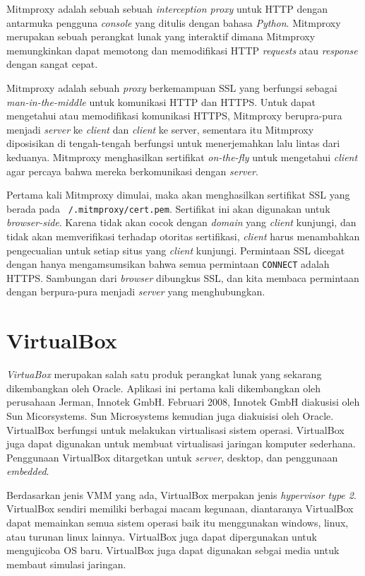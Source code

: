 Mitmproxy adalah sebuah sebuah \textit{interception proxy} untuk HTTP dengan antarmuka pengguna \textit{console} yang ditulis dengan bahasa \textit{Python}. Mitmproxy merupakan sebuah perangkat lunak yang interaktif dimana Mitmproxy memungkinkan dapat memotong dan memodifikasi HTTP \textit{requests} atau \textit{response} dengan sangat cepat.

Mitmproxy adalah sebuah \textit{proxy} berkemampuan SSL yang berfungsi sebagai \textit{man-in-the-middle} untuk komunikasi HTTP dan HTTPS. Untuk dapat mengetahui atau memodifikasi komunikasi HTTPS, Mitmproxy berupra-pura menjadi \textit{server} ke \textit{client} dan \textit{client} ke server, sementara itu Mitmproxy diposisikan di tengah-tengah berfungsi untuk menerjemahkan lalu lintas dari keduanya. Mitmproxy menghasilkan sertifikat \textit{on-the-fly} untuk mengetahui \textit{client} agar percaya bahwa mereka berkomunikasi dengan \textit{server}. \cite{bab2-mitmproxy}

Pertama kali Mitmproxy dimulai, maka akan menghasilkan sertifikat SSL yang berada pada \texttt{~/.mitmproxy/cert.pem}. Sertifikat ini akan digunakan untuk \textit{browser-side}. Karena tidak akan cocok dengan \textit{domain} yang \textit{client} kunjungi, dan tidak akan memverifikasi terhadap otoritas sertifikasi, \textit{client} harus menambahkan pengecualian untuk setiap situs yang \textit{client} kunjungi. Permintaan SSL dicegat dengan hanya mengamsumsikan bahwa semua permintaan \texttt{CONNECT} adalah HTTPS. Sambungan dari \textit{browser} dibungkus SSL, dan kita membaca permintaan dengan berpura-pura menjadi \textit{server} yang menghubungkan.

\section{VirtualBox}
\textit{VirtuaBox} merupakan salah satu produk perangkat lunak yang sekarang dikembangkan oleh Oracle. Aplikasi ini pertama kali dikembangkan oleh perusahaan Jerman, Innotek GmbH. Februari 2008, Innotek GmbH diakusisi oleh Sun Micorsystems. Sun Microsystems kemudian juga diakuisisi oleh Oracle. VirtualBox berfungsi untuk melakukan virtualisasi sistem operasi. VirtualBox juga dapat digunakan untuk membuat virtualisasi jaringan komputer sederhana. Penggunaan VirtualBox ditargetkan untuk \textit{server}, desktop, dan penggunaan \textit{embedded}.

Berdasarkan jenis VMM yang ada, VirtualBox merpakan jenis \textit{hypervisor type 2}. VirtualBox sendiri memiliki berbagai macam kegunaan, diantaranya VirtualBox dapat memainkan semua sistem  operasi baik itu menggunakan windows, linux, atau turunan linux lainnya. VirtualBox juga dapat dipergunakan untuk mengujicoba OS baru. VirtualBox juga dapat digunakan sebgai media untuk membaut simulasi jaringan.

